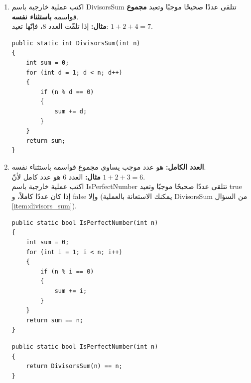 \documentclass[14pt]{extarticle}
\begin{document}
\begin{enumerate}[resume, itemsep=2em]
\item \label{item:divisors_sum}
اكتب عملية خارجية باسم \textenglish{DivisorsSum} تتلقى عددًا صحيحًا موجبًا وتعيد \textbf{مجموع} قواسمه \textbf{باستثناء نفسه}. \\
\textbf{مثال:} إذا تلقّت العدد $8$، فإنّها تعيد: $1 + 2 + 4 = 7$.
\ifwithsols
\begin{boxSolution}
\begin{english}
\begin{verbatim}
public static int DivisorsSum(int n)
{
    int sum = 0;
    for (int d = 1; d < n; d++)
    {
        if (n % d == 0)
        {
            sum += d;
        }
    }
    return sum;
}
\end{verbatim}
\end{english}
\end{boxSolution}
\fi
\filbreak

\item \textbf{العدد الكامل:} هو عدد موجب يساوي مجموع قواسمه باستثناء نفسه. \\
\textbf{مثال:} العدد $6$ هو عدد كامل لأنّ $1 + 2 + 3 = 6$. \\
اكتب عملية خارجية باسم \textenglish{IsPerfectNumber} تتلقى عددًا صحيحًا موجبًا وتعيد \textenglish{true} إذا كان عددًا كاملاً، و \textenglish{false} وإلا (يمكنك الاستعانة بالعملية \textenglish{DivisorsSum} من السؤال \ref{item:divisors_sum}).
\ifwithsols
\begin{boxSolution}[1]
\begin{english}
\begin{verbatim}
public static bool IsPerfectNumber(int n)
{
    int sum = 0;
    for (int i = 1; i < n; i++)
    {
        if (n % i == 0)
        {
            sum += i;
        }
    }
    return sum == n;
}
\end{verbatim}
\end{english}
\end{boxSolution}

\filbreak

\begin{boxSolution}
\begin{english}
\begin{verbatim}
public static bool IsPerfectNumber(int n)
{
    return DivisorsSum(n) == n;
}
\end{verbatim}
\end{english}
\end{boxSolution}
\fi
\filbreak


\end{enumerate}
\end{document}
